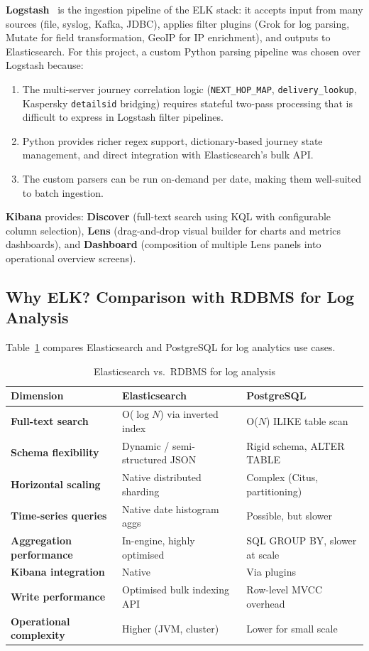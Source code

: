 \documentclass[12pt,a4paper,oneside]{report}
\newcommand{\rowA}{\rowcolor{rowgray}}
\begin{document}
\textbf{Logstash}~\cite{kibanaGuide} is the ingestion pipeline of the ELK stack: it accepts input from many sources (file, syslog, Kafka, JDBC), applies filter plugins (Grok for log parsing, Mutate for field transformation, GeoIP for IP enrichment), and outputs to Elasticsearch.
For this project, a custom Python parsing pipeline was chosen over Logstash because:

\begin{enumerate}
  \item The multi-server journey correlation logic (\texttt{NEXT\_HOP\_MAP}, \texttt{delivery\_lookup}, Kaspersky \texttt{detailsid} bridging) requires stateful two-pass processing that is difficult to express in Logstash filter pipelines.
  \item Python provides richer regex support, dictionary-based journey state management, and direct integration with Elasticsearch's bulk API.
  \item The custom parsers can be run on-demand per date, making them well-suited to batch ingestion.
\end{enumerate}

\textbf{Kibana} provides: \textbf{Discover} (full-text search using KQL with configurable column selection), \textbf{Lens} (drag-and-drop visual builder for charts and metrics dashboards), and \textbf{Dashboard} (composition of multiple Lens panels into operational overview screens).

\subsection{Why ELK? Comparison with RDBMS for Log Analysis}

Table~\ref{tab:elk-vs-rdbms} compares Elasticsearch and PostgreSQL for log analytics use cases.

\begin{table}[H]
\centering
\caption{Elasticsearch vs.\ RDBMS for log analysis}
\label{tab:elk-vs-rdbms}
\begin{tabularx}{\textwidth}{@{}>{\bfseries}p{4.2cm} X X@{}}
\toprule
Dimension & Elasticsearch & PostgreSQL \\
\midrule
\rowA Full-text search & O($\log N$) via inverted index & O($N$) ILIKE table scan \\
Schema flexibility & Dynamic / semi-structured JSON & Rigid schema, ALTER TABLE \\
\rowA Horizontal scaling & Native distributed sharding & Complex (Citus, partitioning) \\
Time-series queries & Native date histogram aggs & Possible, but slower \\
\rowA Aggregation performance & In-engine, highly optimised & SQL GROUP BY, slower at scale \\
Kibana integration & Native & Via plugins \\
\rowA Write performance & Optimised bulk indexing API & Row-level MVCC overhead \\
Operational complexity & Higher (JVM, cluster) & Lower for small scale \\
\bottomrule
\end{tabularx}
\end{table}
\end{document}
